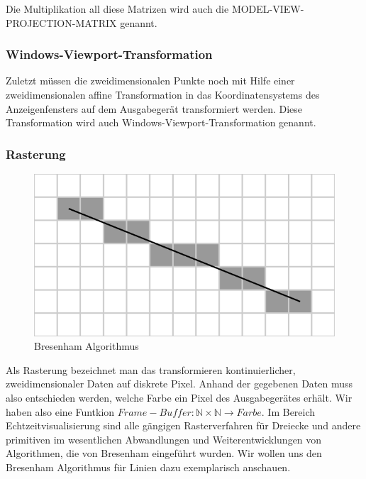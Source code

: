 Die Multiplikation all diese Matrizen wird auch die MODEL-VIEW-PROJECTION-MATRIX genannt. 

\subsubsection*{Windows-Viewport-Transformation}
Zuletzt müssen die zweidimensionalen Punkte noch mit Hilfe einer zweidimensionalen affine Transformation  in das Koordinatensystems des Anzeigenfensters auf dem Ausgabegerät transformiert werden. 
Diese Transformation wird auch Windows-Viewport-Transformation genannt.

\subsubsection{Rasterung}
\begin{figure}[H]
    \centering
    \includegraphics[width=1.0\textwidth]{images/bresenham.png}
    \caption{Bresenham Algorithmus}
    \label{fig:gimbal+lock}
\end{figure}
Als Rasterung bezeichnet man das transformieren kontinuierlicher, zweidimensionaler Daten auf diskrete Pixel.
Anhand der gegebenen Daten muss also entschieden werden, welche Farbe ein Pixel des Ausgabegerätes erhält.
Wir haben also eine Funtkion $Frame-Buffer: \mathbb{N} \times \mathbb{N} \to Farbe$.
Im Bereich Echtzeitvisualisierung  sind alle gängigen Rasterverfahren für Dreiecke und andere primitiven  im wesentlichen Abwandlungen und Weiterentwicklungen  von Algorithmen, die von  Bresenham eingeführt wurden. Wir wollen uns den Bresenham Algorithmus für Linien dazu exemplarisch anschauen.


